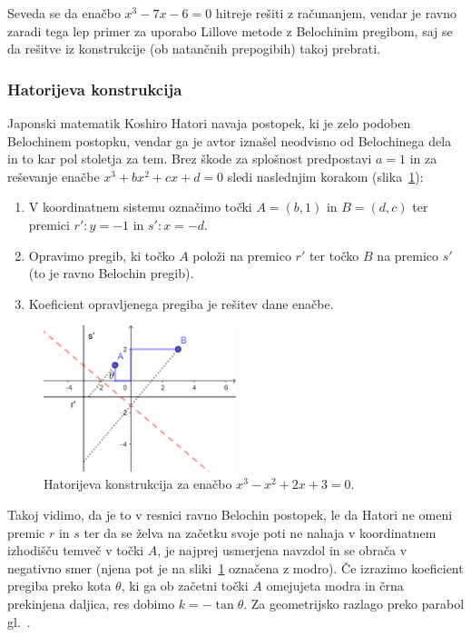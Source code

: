 Seveda se da enačbo $x^3 - 7x - 6 = 0$ hitreje rešiti z računanjem, vendar je ravno zaradi tega lep primer za uporabo Lillove metode z Belochinim pregibom, saj se da rešitve iz konstrukcije (ob natančnih prepogibih) takoj prebrati.

\subsubsection{Hatorijeva konstrukcija}

Japonski matematik Koshiro Hatori navaja postopek, ki je zelo podoben Belochinem postopku, vendar ga je avtor iznašel neodvisno od Belochinega dela in to kar pol stoletja za tem. Brez škode za splošnost predpostavi $a = 1$ in za reševanje enačbe $x^3 + bx^2 + cx + d = 0$ sledi naslednjim korakom (slika~\ref{fig:hatori}):
\begin{enumerate}
    \item V koordinatnem sistemu označimo točki $A = (b, 1)$ in $B = (d, c)$ ter premici $r': y = -1$ in $s': x = -d$.
    \item Opravimo pregib, ki točko $A$ položi na premico $r'$ ter točko $B$ na premico $s'$ (to je ravno Belochin pregib).
    \item Koeficient opravljenega pregiba je rešitev dane enačbe.
\end{enumerate}

\begin{figure}[h]
    \centering
    \includegraphics[width=0.5\textwidth]{images/kubična enačba/hatori.png}
    \caption[Hatorijeva konstrukcija]{Hatorijeva konstrukcija za enačbo $x^3 - x^2 + 2x + 3 = 0$.}
    \label{fig:hatori}
\end{figure}

Takoj vidimo, da je to v resnici ravno Belochin postopek, le da Hatori ne omeni premic $r$ in $s$ ter da se želva na začetku svoje poti ne nahaja v koordinatnem izhodišču temveč v točki $A$, je najprej usmerjena navzdol in se obrača v negativno smer (njena pot je na sliki~\ref{fig:hatori} označena z modro). Če izrazimo koeficient pregiba preko kota $\theta$, ki ga ob začetni točki $A$ omejujeta modra in črna prekinjena daljica, res dobimo $k = - \tan \theta$. Za geometrijsko razlago preko parabol gl.~\cite{hatori2003}.

